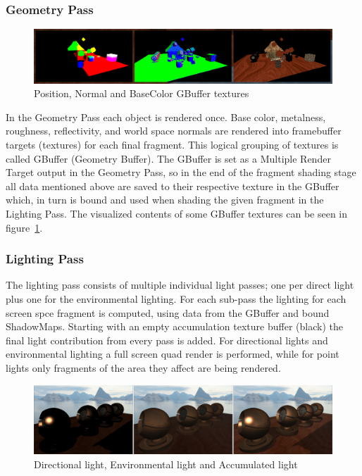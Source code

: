 \subsubsection{Geometry Pass}

\begin{figure}[ht]
    \centering
    \includegraphics[scale=0.3, clip=true]{./image/gbuffer.png}
    \caption{Position, Normal and BaseColor GBuffer textures}
\label{fig:gbuf}
\end{figure}

In the Geometry Pass  each object is rendered once. Base color, metalness, roughness, reflectivity, and world
space normals are rendered into framebuffer targets (textures) for each final fragment. This logical grouping of
textures is called GBuffer (Geometry Buffer). The GBuffer is set as a Multiple Render Target output in the Geometry
Pass, so in the end of the fragment shading stage all data mentioned above are saved to their respective texture
in the GBuffer which, in turn is bound and used when shading the given fragment in the Lighting Pass. The visualized
contents of some GBuffer textures can be seen in figure~\ref{fig:gbuf}.

\subsubsection{Lighting Pass}

The lighting pass consists of multiple individual light passes; one per direct light plus one for the
environmental lighting. For each sub-pass the lighting for each screen spce fragment is computed, using data from
the GBuffer and bound ShadowMaps. Starting with an empty accumulation texture buffer (black) the final light
contribution from every pass is added. For directional lights and environmental lighting a full screen quad render
is performed, while for point lights only fragments of the area they affect are being rendered.

\begin{figure}[h]
    \centering
    \includegraphics[scale=0.18, clip=true]{./image/lightpasses.png}
    \caption{Directional light, Environmental light and Accumulated light}
\label{fig:lpasses}
\end{figure}


